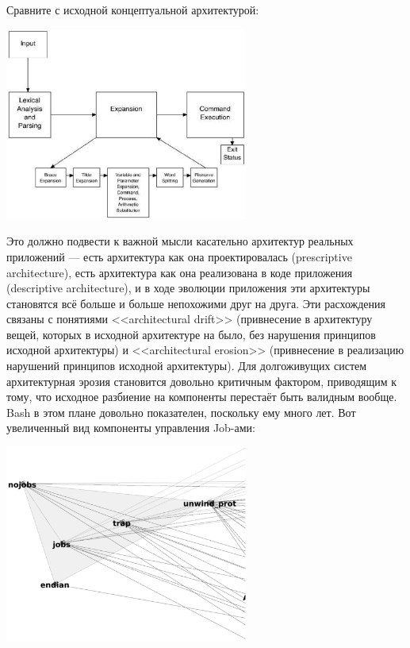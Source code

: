 \documentclass{../../text-style}
\begin{document}
Сравните с исходной концептуальной архитектурой:

\begin{center}
    \includegraphics[width=0.6\textwidth]{bashArchitecture.png}
\end{center}

Это должно подвести к важной мысли касательно архитектур реальных приложений --- есть архитектура как она проектировалась (prescriptive architecture), есть архитектура как она реализована в коде приложения (descriptive architecture), и в ходе эволюции приложения эти архитектуры становятся всё больше и больше непохожими друг на друга. Эти расхождения связаны с понятиями <<architectural drift>> (привнесение в архитектуру вещей, которых в исходной архитектуре на было, без нарушения принципов исходной архитектуры) и <<architectural erosion>> (привнесение в реализацию нарушений принципов исходной архитектуры). Для долгоживущих систем архитектурная эрозия становится довольно критичным фактором, приводящим к тому, что исходное разбиение на компоненты перестаёт быть валидным вообще. Bash в этом плане довольно показателен, поскольку ему много лет. Вот увеличенный вид компоненты управления Job-ами:

\begin{center}
    \includegraphics[width=0.6\textwidth]{bashJobControl.png}
\end{center}
\end{document}
